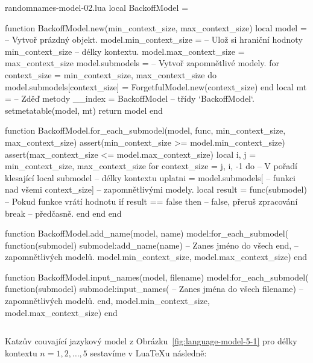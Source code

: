 \documentclass{csbulletin}
\newcommand\myinputminted[3][]{%
  \inputminted[#1]{#2}{#3}%
}
\newcommand\myinputminted[3][]{%
  \inputminted[#1]{#2}{code-placeholder.#2}%
}
\begin{document}
\begin{filecontents}{randomnames-model-02.lua}
local BackoffModel = {}

function BackoffModel.new(min_context_size, max_context_size)
  local model = {}                  -- Vytvoř prázdný objekt.
  model.min_context_size =          -- Ulož si hraniční hodnoty
    min_context_size                -- délky kontextu.
  model.max_context_size =
    max_context_size
  model.submodels = {}              -- Vytvoř zapomnětlivé modely.
  for context_size = min_context_size, max_context_size do
    model.submodels[context_size]
      = ForgetfulModel.new(context_size)
  end
  local mt = {                      -- Zděď metody
    __index = BackoffModel }        -- třídy `BackoffModel`.
  setmetatable(model, mt)
  return model
end

function BackoffModel.for_each_submodel(model, func,
                                        min_context_size,
                                        max_context_size)
  assert(min_context_size >= model.min_context_size)
  assert(max_context_size <= model.max_context_size)
  local i, j = min_context_size, max_context_size
  for context_size = j, i, -1 do    -- V pořadí klesající
    local submodel                  -- délky kontextu uplatni
      = model.submodels[            -- funkci nad všemi
        context_size]               -- zapomnětlivými modely.
    local result = func(submodel)   -- Pokud funkce vrátí hodnotu
    if result == false then         -- false, přeruš zpracování
      break                         -- předčasně.
    end
  end
end

function BackoffModel.add_name(model, name)
  model:for_each_submodel(
    function(submodel)
      submodel:add_name(name)       -- Zanes jméno do všech
    end,                            -- zapomnětlivých modelů.
    model.min_context_size,
    model.max_context_size)
end

function BackoffModel.input_names(model, filename)
  model:for_each_submodel(
    function(submodel)
      submodel:input_names(         -- Zanes jména do všech
        filename)                   -- zapomnětlivých modelů.
    end,
    model.min_context_size,
    model.max_context_size)
end
\end{filecontents}
\myinputminted{lua}{randomnames-model-02.lua}

Katzův couvající jazykový model z Obrázku~\ref{fig:language-model-5-1} pro délky kontextu $n=1, 2, \ldots, 5$ sestavíme v Lua\TeX u následně:
\end{document}
